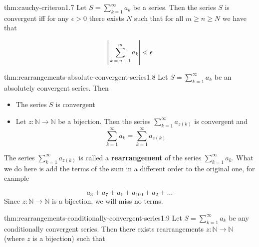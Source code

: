 \documentclass[landscape, 8pt]{extarticle}
\begin{document}
\begin{multicols}{3}

%

\begin{thm}{thm:cauchy-criteron}{1.7}
	Let $S=\sum_{k=1}^{\infty}a_{k}$ be a series. Then the series $S$ is convergent iff for any $\epsilon>0$ there exists $N$ such that for all $m\ge n\ge N$ we have that

	\[\left\lvert  \sum_{k=n+1}^{m} a_{k}  \right\rvert < \epsilon\]
\end{thm}


\begin{thm}{thm:rearrangements-absolute-convergent-series}{1.8}
	Let $S=\sum_{k=1}^{\infty} a_{k}$ be an absolutely convergent series. Then

	\begin{itemize}
		\setlength\itemsep{0em}
		\item The series $S$ is convergent

		\item Let $z:\mathbb{N}\to \mathbb{N}$ be a bijection. Then the series $\sum_{k=1}^{\infty} a_{z(k)}$ is convergent and
			\[\sum_{k=1}^{\infty} a_{k} = \sum_{k=1}^{\infty} a_{z(k)} \]
	\end{itemize}

	The series $\sum_{k=1}^{\infty} a_{z(k)}$ is called a \textbf{rearrangement} of the series $\sum_{k=1}^{\infty} a_{k}$. What we do here is add the terms of the sum in a different order to the original one, for example

	\[a_{3} + a_{7}+ a_{1}+ a_{100} + a_{2} + \dots\]
	Since $z:\mathbb{N}\to \mathbb{N}$ is a bijection, we will miss no terms.

\end{thm}

\newpage
\begin{thm}{thm:rearrangements-conditionally-convergent-series}{1.9}
	Let $S = \sum_{k=1}^{\infty} a_{k}$ be any conditionally convergent series. Then there exists rearrangements $z:\mathbb{N}\to \mathbb{N}$ (where $z$ is a bijection) such that


\end{thm}
\end{multicols}
\end{document}
